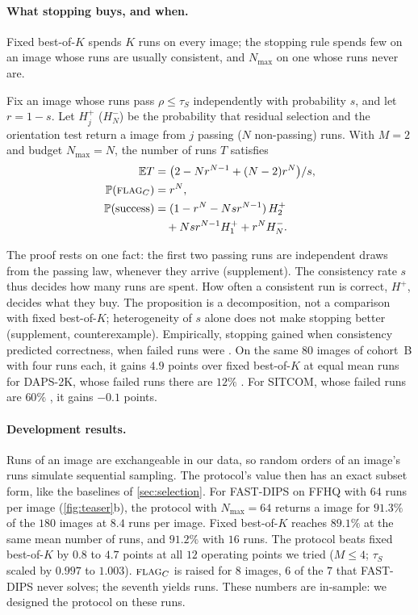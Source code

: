 \paragraph{What stopping buys, and when.}
Fixed best-of-$K$ spends $K$ runs on every image; the stopping rule spends few on an image whose runs are usually consistent, and $N_{\max}$ on one whose runs never are.
\begin{proposition}
\label{prop:stop}
Fix an image whose runs pass $\rho\le\tau_S$ independently with probability $s$, and let $r=1-s$.
Let $H_j^+$ ($H_N^-$) be the probability that residual selection and the orientation test return a \good image from $j$ passing ($N$ non-passing) runs.
With $M=2$ and budget $N_{\max}=N$, the number of runs $T$ satisfies
\begin{align*}
\mathbb{E} T&=\bigl(2-Nr^{N-1}+(N-2)r^N\bigr)/s,\\
\mathbb{P}(\textsc{flag}_C)&=r^N,\\
\mathbb{P}(\mathrm{success})&=(1-r^N-Nsr^{N-1})\,H_2^+\\
&\quad+Nsr^{N-1}H_1^+ + r^NH_N^-.
\end{align*}
\end{proposition}
The proof rests on one fact: the first two passing runs are independent draws from the passing law, whenever they arrive (supplement).
The consistency rate $s$ thus decides how many runs are spent.
How often a consistent run is correct, $H^+$, decides what they buy.
The proposition is a decomposition, not a comparison with fixed best-of-$K$; heterogeneity of $s$ alone does not make stopping better (supplement, counterexample).
Empirically, stopping gained when consistency predicted correctness, \ie when failed runs were \incons.
On the same $80$ images of cohort~B with four runs each, it gains $4.9$ points over fixed best-of-$K$ at equal mean runs for DAPS-2K, whose failed runs there are $12\%$ \cons.
For SITCOM, whose failed runs are $60\%$ \cons, it gains $-0.1$ points.

\paragraph{Development results.}
Runs of an image are exchangeable in our data, so random orders of an image's runs simulate sequential sampling.
The protocol's value then has an exact subset form, like the baselines of \cref{sec:selection}.
For FAST-DIPS on FFHQ with $64$ runs per image (\cref{fig:teaser}b), the protocol with $N_{\max}=64$ returns a \good image for $91.3\%$ of the $180$ images at $8.4$ runs per image.
Fixed best-of-$K$ reaches $89.1\%$ at the same mean number of runs, and $91.2\%$ with $16$ runs.
The protocol beats fixed best-of-$K$ by $0.8$ to $4.7$ points at all $12$ operating points we tried ($M\le4$; $\tau_S$ scaled by $0.997$ to $1.003$).
$\textsc{flag}_C$ is raised for $8$ images, $6$ of the $7$ that FAST-DIPS never solves; the seventh yields \cons runs.
These numbers are in-sample: we designed the protocol on these runs.

